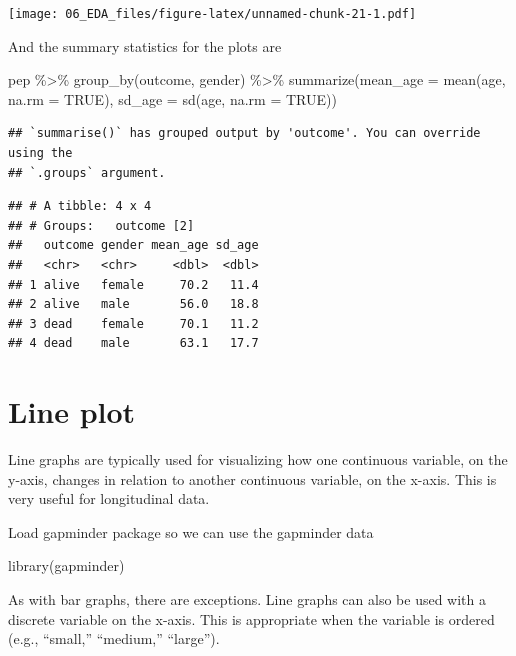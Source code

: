 \documentclass[
  10pt,
]{krantz}
\newenvironment{Shaded}{\begin{snugshade}}{\end{snugshade}}
\newcommand{\AttributeTok}[1]{\textcolor[rgb]{0.77,0.63,0.00}{#1}}
\newcommand{\ConstantTok}[1]{\textcolor[rgb]{0.00,0.00,0.00}{#1}}
\newcommand{\FunctionTok}[1]{\textcolor[rgb]{0.00,0.00,0.00}{#1}}
\newcommand{\NormalTok}[1]{#1}
\newcommand{\SpecialCharTok}[1]{\textcolor[rgb]{0.00,0.00,0.00}{#1}}
\begin{document}
\texttt{[image: 06\_EDA\_files/figure-latex/unnamed-chunk-21-1.pdf]}

And the summary statistics for the plots are

\begin{Shaded}
\begin{Highlighting}[]
\NormalTok{pep }\SpecialCharTok{\%\textgreater{}\%} \FunctionTok{group\_by}\NormalTok{(outcome, gender) }\SpecialCharTok{\%\textgreater{}\%}
  \FunctionTok{summarize}\NormalTok{(}\AttributeTok{mean\_age =} \FunctionTok{mean}\NormalTok{(age, }\AttributeTok{na.rm =} \ConstantTok{TRUE}\NormalTok{), }\AttributeTok{sd\_age =} \FunctionTok{sd}\NormalTok{(age, }\AttributeTok{na.rm =} \ConstantTok{TRUE}\NormalTok{))}
\end{Highlighting}
\end{Shaded}

\begin{verbatim}
## `summarise()` has grouped output by 'outcome'. You can override using the
## `.groups` argument.
\end{verbatim}

\begin{verbatim}
## # A tibble: 4 x 4
## # Groups:   outcome [2]
##   outcome gender mean_age sd_age
##   <chr>   <chr>     <dbl>  <dbl>
## 1 alive   female     70.2   11.4
## 2 alive   male       56.0   18.8
## 3 dead    female     70.1   11.2
## 4 dead    male       63.1   17.7
\end{verbatim}

\hypertarget{line-plot}{%
\section{\texorpdfstring{Line plot}{Line plot}}\label{line-plot}}

Line graphs are typically used for visualizing how one continuous variable, on the y-axis, changes in relation to another continuous variable, on the x-axis. This is very useful for longitudinal data.

Load gapminder package so we can use the gapminder data

\begin{Shaded}
\begin{Highlighting}[]
\FunctionTok{library}\NormalTok{(gapminder)}
\end{Highlighting}
\end{Shaded}

As with bar graphs, there are exceptions. Line graphs can also be used with a discrete variable on the x-axis. This is appropriate when the variable is ordered (e.g., ``small,'' ``medium,'' ``large'').
\end{document}
